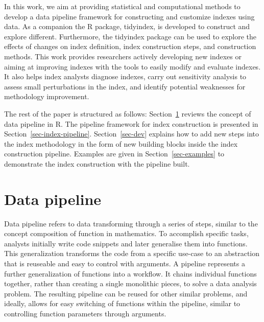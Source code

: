 \documentclass[
]{interact}
\begin{document}
In this work, we aim at providing statistical and computational methods
to develop a data pipeline framework for constructing and customize
indexes using data. As a companion the R package, tidyindex, is
developed to construct and explore different. Furthermore, the tidyindex
package can be used to explore the effects of changes on index
definition, index construction steps, and construction methods. This
work provides researchers actively developing new indexes or aiming at
improving indexes with the tools to easily modify and evaluate indexes.
It also helps index analysts diagnose indexes, carry out sensitivity
analysis to assess small perturbations in the index, and identify
potential weaknesses for methodology improvement.

The rest of the paper is structured as follows:
Section~\ref{sec-pipeline} reviews the concept of data pipeline in R.
The pipeline framework for index construction is presented in
Section~\ref{sec-index-pipeline}. Section~\ref{sec-dev} explains how to
add new steps into the index methodology in the form of new building
blocks inside the index construction pipeline. Examples are given in
Section~\ref{sec-examples} to demonstrate the index construction with
the pipeline built.

\hypertarget{sec-pipeline}{%
\section{Data pipeline}\label{sec-pipeline}}

Data pipeline refers to data transforming through a series of steps,
similar to the concept composition of function in mathematics. To
accomplish specific tasks, analysts initially write code snippets and
later generalise them into functions. This generalization transforms the
code from a specific use-case to an abstraction that is reuseable and
easy to control with arguments. A pipeline represents a further
generalization of functions into a workflow. It chains individual
functions together, rather than creating a single monolithic pieces, to
solve a data analysis problem. The resulting pipeline can be reused for
other similar problems, and ideally, allows for easy switching of
functions within the pipeline, similar to controlling function
parameters through arguments.
\end{document}

